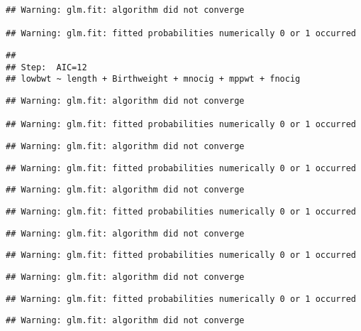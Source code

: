 \documentclass[]{article}
\begin{document}
\begin{verbatim}
## Warning: glm.fit: algorithm did not converge

## Warning: glm.fit: fitted probabilities numerically 0 or 1 occurred
\end{verbatim}

\begin{verbatim}
## 
## Step:  AIC=12
## lowbwt ~ length + Birthweight + mnocig + mppwt + fnocig
\end{verbatim}

\begin{verbatim}
## Warning: glm.fit: algorithm did not converge

## Warning: glm.fit: fitted probabilities numerically 0 or 1 occurred
\end{verbatim}

\begin{verbatim}
## Warning: glm.fit: algorithm did not converge
\end{verbatim}

\begin{verbatim}
## Warning: glm.fit: fitted probabilities numerically 0 or 1 occurred
\end{verbatim}

\begin{verbatim}
## Warning: glm.fit: algorithm did not converge
\end{verbatim}

\begin{verbatim}
## Warning: glm.fit: fitted probabilities numerically 0 or 1 occurred
\end{verbatim}

\begin{verbatim}
## Warning: glm.fit: algorithm did not converge
\end{verbatim}

\begin{verbatim}
## Warning: glm.fit: fitted probabilities numerically 0 or 1 occurred
\end{verbatim}

\begin{verbatim}
## Warning: glm.fit: algorithm did not converge
\end{verbatim}

\begin{verbatim}
## Warning: glm.fit: fitted probabilities numerically 0 or 1 occurred
\end{verbatim}

\begin{verbatim}
## Warning: glm.fit: algorithm did not converge
\end{verbatim}
\end{document}
